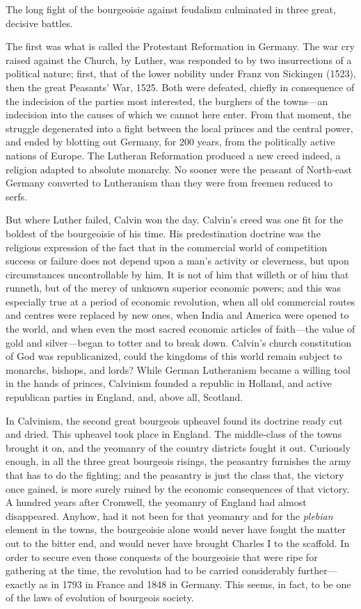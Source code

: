 The long fight of the bourgeoisie against feudalism culminated in three great,
decisive battles.

The first was what is called the Protestant Reformation in Germany. The war cry
raised against the Church, by Luther, was responded to by two insurrections of a
political nature; first, that of the lower nobility under Franz von Sickingen
(1523), then the great Peasants' War, 1525. Both were defeated, chiefly in
consequence of the indecision of the parties most interested, the burghers of
the towns---an indecision into the causes of which we cannot here enter. From
that moment, the struggle degenerated into a fight between the local princes and
the central power, and ended by blotting out Germany, for 200 years, from the
politically active nations of Europe. The Lutheran Reformation produced a new
creed indeed, a religion adapted to absolute monarchy. No sooner were the
peasant of North-east Germany converted to Lutheranism than they were from
freemen reduced to serfs. 

But where Luther failed, Calvin won the day. Calvin's creed was one fit for the
boldest of the bourgeoisie of his time. His predestination doctrine was the
religious expression of the fact that in the commercial world of competition
success or failure does not depend upon a man's activity or cleverness, but upon
circumstances uncontrollable by him. It is not of him that willeth or of him
that runneth, but of the mercy of unknown superior economic powers; and this was
especially true at a period of economic revolution, when all old commercial
routes and centres were replaced by new ones, when India and America were opened
to the world, and when even the most sacred economic articles of faith---the
value of gold and silver---began to totter and to break down. Calvin's church
constitution of God was republicanized, could the kingdoms of this world remain
subject to monarchs, bishops, and lords? While German Lutheranism became a
willing tool in the hands of princes, Calvinism founded a republic in Holland,
and active republican parties in England, and, above all, Scotland.

In Calvinism, the second great bourgeois upheavel found its doctrine ready cut
and dried. This upheavel took place in England. The middle-class of the towns
brought it on, and the yeomanry of the country districts fought it out.
Curiously enough, in all the three great bourgeois risings, the peasantry
furnishes the army that has to do the fighting; and the peasantry is just the
class that, the victory once gained, is more surely ruined by the economic
consequences of that victory. A hundred years after Cromwell, the yeomanry of
England had almost disappeared. Anyhow, had it not been for that yeomanry and
for the \emph{plebian} element in the towns, the bourgeoisie alone would never
have fought the matter out to the bitter end, and would never have brought
Charles I to the scaffold. In order to secure even those conquests of the
bourgeoisie that were ripe for gathering at the time, the revolution had to be
carried considerably further---exactly as in 1793 in France and 1848 in Germany.
This seems, in fact, to be one of the laws of evolution of bourgeois society.

